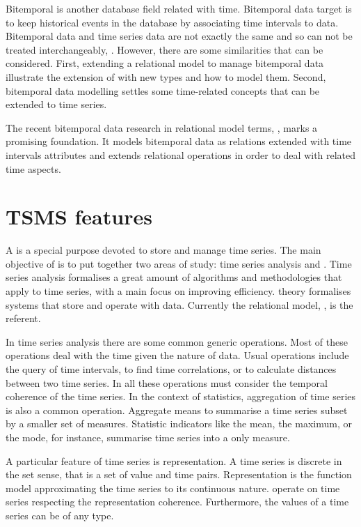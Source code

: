 Bitemporal  is another database field related with
time. Bitemporal data target is to keep historical events in the
database by associating time intervals to data.  Bitemporal data and
time series data are not exactly the same and so can not be treated
interchangeably, \cite{schmidt95}. However, there are some
similarities that can be considered. First, extending a relational
model to manage bitemporal data illustrate the extension of
 with new types and how to model them. Second, bitemporal
data modelling settles some time-related concepts that can be extended
to time series.

The recent bitemporal data research in relational  model terms,
\cite{date02:_tempor_data_relat_model}, marks a promising
foundation. It models bitemporal data as relations extended with time
intervals attributes and extends relational operations in order to
deal with related time aspects.





\section{TSMS features}
\label{sec:tsms-features}

A  is a special purpose  devoted to store and
manage time series. The main objective of  is to put
together two areas of study: time series analysis and .
Time series analysis formalises a great amount of algorithms and
methodologies that apply to time series, with a main focus on
improving efficiency.  theory formalises systems that store
and operate with data. Currently the relational model,
\cite{date:introduction}, is the referent.

In time series analysis there are some common generic operations.
Most of these operations deal with the time given the nature of data.
Usual operations include the query of time intervals, to find time
correlations, or to calculate distances between two time series. In
all these operations  must consider the temporal coherence
of the time series.  In the context of statistics, aggregation of time
series is also a common operation. Aggregate means to summarise a time
series subset by a smaller set of measures. Statistic indicators like
the mean, the maximum, or the mode, for instance, summarise time
series into a only measure.

A particular feature of time series is representation. A time series
is discrete in the set sense, that is a set of value and time
pairs. Representation is the function model approximating the time
series to its continuous nature.  operate on time series
respecting the representation coherence. Furthermore, the values of a
time series can be of any type.

